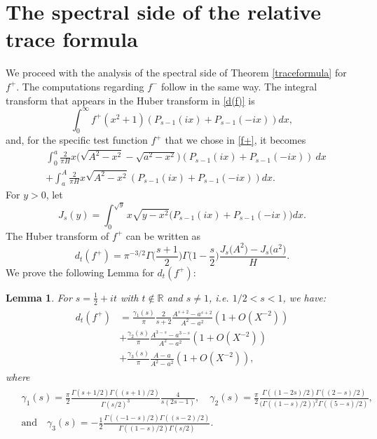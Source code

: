 \documentclass[a4paper,11pt]{amsart}
\newtheorem{lem}[theorem]{Lemma}
\theoremstyle{definition}
\begin{document}
\section{The spectral side of the relative trace formula}\label{The spectral side of the relative trace formula}
We proceed with the analysis of the spectral side of Theorem \ref{traceformula} for $f^{+}$. The computations regarding $f^{-}$ follow in the same way.
The integral transform that appears in the Huber transform in \eqref{d(f)} is
$$\int_0^{\infty}f^{+}(x^2+1)(P_{s-1}(ix)+P_{s-1}(-ix))dx,$$ and, for the specific test function $f^{+}$ that we chose in \eqref{f+}, it becomes
\begin{align}
    & \int_0^{a}\frac{2}{\pi H}x \Big(\sqrt{A^2-x^2}-\sqrt{a^2-x^2}\Big)(P_{s-1}(ix)+P_{s-1}(-ix))\: dx \\
    & + \int_{a}^{A}\frac{2}{\pi H}x\sqrt{A^2-x^2}(P_{s-1}(ix)+P_{s-1}(-ix)) dx.
\end{align}
For $y>0$, let 
\begin{equation}\label{Jsy}
    J_s(y)=\int_0^{\sqrt{y}}x\sqrt{y-x^2}\big(P_{s-1}(ix)+P_{s-1}(-ix)\big)dx.
\end{equation}
The Huber transform of $f^{+}$ can be written as
\begin{equation}\label{Jdiff}
d_t(f^{+})=\pi^{-3/2} \Gamma\Big(\frac{s+1}{2}\Big)\Gamma\Big(1-\frac{s}{2}\Big)\frac{J_s\big(A^2\big)-J_s\big(a^2\big)}{H}.
\end{equation}
We prove the following Lemma for $d_t(f^{+})$:
\begin{lem}\label{mainlem}
For $s=\frac{1}{2}+it$ with $t\notin \mathbb{R}$ and $s\neq 1$, i.e. $1/2<s<1$, we have:
\begin{align}\label{dt3}
    \begin{split}
        d_t(f^{+})&=\frac{\gamma_1(s)}{\pi}\frac{2}{s+2}\frac{A^{s+2}-a^{s+2}}{A^2-a^2}(1+O(X^{-2})) \\
        &+\frac{\gamma_2(s)}{\pi}\frac{A^{3-s}-a^{3-s}}{A^2-a^2}(1+O(X^{-2}))\\
        &+\frac{\gamma_3(s)}{\pi}\frac{A-a}{A^2-a^2}(1+O(X^{-2})),
    \end{split}
\end{align}
where
\begin{align}\label{gamma123}
    \begin{split}
        &\gamma_1(s)=\frac{\pi}{2}\frac{\Gamma(s+1/2)\Gamma((s+1)/2)}{\Gamma(s/2)^3}\frac{4}{s(2s-1)}, \quad \gamma_2(s)=\frac{\pi}{2}\frac{\Gamma((1-2s)/2)\Gamma((2-s)/2)}{\big(\Gamma((1-s)/2)\big)^2\Gamma((5-s)/2)}, \\
        &\text{and} \quad \gamma_3(s)=-\frac{1}{2}\frac{\Gamma((-1-s)/2)\Gamma((s-2)/2)}{\Gamma((1-s)/2)\Gamma(s/2)}.
    \end{split}
\end{align}

\end{lem}
\end{document}
